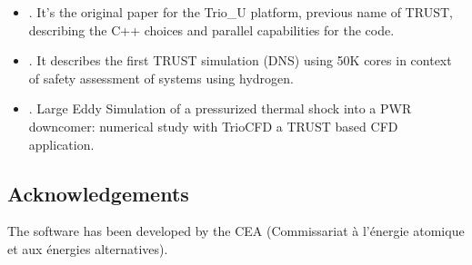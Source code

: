 \begin{itemize}
   \item {}. It's the original paper for the Trio\_U platform, previous name of TRUST, describing the C++ choices and parallel capabilities for the code.
   \item {}. It describes the first TRUST simulation (DNS) using 50K cores in context of safety assessment of systems using hydrogen.
   \item {}. Large Eddy Simulation of a pressurized thermal shock into a PWR downcomer: numerical study with TrioCFD a TRUST based CFD application.
\end{itemize}

\subsection{Acknowledgements}
\label{sec::TRUST Platform:acknowledgements}

The software has been developed by the CEA (Commissariat à l'énergie atomique et aux énergies alternatives). 

